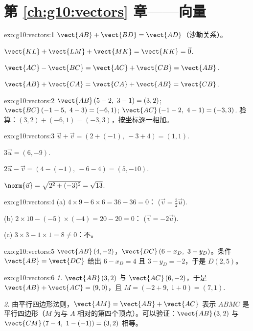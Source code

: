 \section*{第 \ref{ch:g10:vectors} 章——向量}

\begin{solution}{exo:g10:vectors:1}
$\vect{AB} + \vect{BD} = \vect{AD}$（沙勒关系）。

$\vect{KL} + \vect{LM} + \vect{MK} = \vect{KK} = \vec 0$.

$\vect{AC} - \vect{BC} = \vect{AC} + \vect{CB} = \vect{AB}$.

$\vect{AB} + \vect{CA} = \vect{CA} + \vect{AB} = \vect{CB}$.
\end{solution}

\begin{solution}{exo:g10:vectors:2}
$\vect{AB}\,(5-2,\ 3-1) = (3, 2)$; \quad
$\vect{BC}\,(-1-5,\ 4-3) = (-6, 1)$; \quad
$\vect{AC}\,(-1-2,\ 4-1) = (-3, 3)$.
验算：$(3, 2) + (-6, 1) = (-3, 3)$，按坐标逐一相加。
\end{solution}

\begin{solution}{exo:g10:vectors:3}
$\vec u + \vec v = (2 + (-1),\ -3 + 4) = (1, 1)$.

$3\vec u = (6, -9)$.

$2\vec u - \vec v = (4 - (-1),\ -6 - 4) = (5, -10)$.

$\norm{\vec u} = \sqrt{2^2 + (-3)^2} = \sqrt{13}$.
\end{solution}

\begin{solution}{exo:g10:vectors:4}
(a) $4 \times 9 - 6 \times 6 = 36 - 36 = 0$：
($\vec v = \frac32 \vec u$).

(b) $2 \times 10 - (-5) \times (-4) = 20 - 20 = 0$：
($\vec v = -2\vec u$).

(c) $3 \times 3 - 1 \times 1 = 8 \neq 0$：不。
\end{solution}

\begin{solution}{exo:g10:vectors:5}
$\vect{AB}\,(4, -2)$，$\vect{DC}\,(6 - x_D,\ 3 - y_D)$。条件
$\vect{AB} = \vect{DC}$ 给出 $6 - x_D = 4$ 且 $3 - y_D = -2$，于是
$D(2, 5)$。
\end{solution}

\begin{solution}{exo:g10:vectors:6}
\emph{1.} $\vect{AB}\,(3, 2)$ 与 $\vect{AC}\,(6, -2)$，于是
$\vect{AB} + \vect{AC} = (9, 0)$，且
$M = (-2 + 9,\ 1 + 0) = (7, 1)$.

\emph{2.} 由平行四边形法则，$\vect{AM} = \vect{AB} + \vect{AC}$
表示 $ABMC$ 是平行四边形（$M$ 为与
$A$ 相对的第四个顶点）。可以验证：$\vect{AB}\,(3,2)$ 与 $\vect{CM}\,(7-4,\ 1-(-1)) =
(3, 2)$ 相等。
\end{solution}

